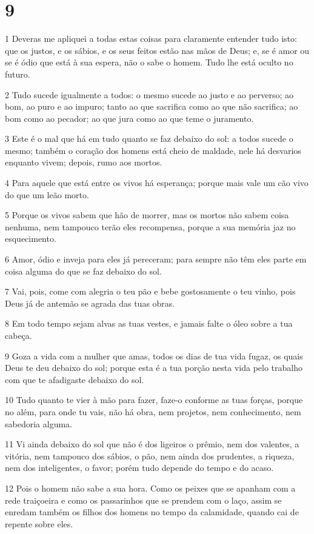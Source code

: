 \chapter{9}

\par 1 Deveras me apliquei a todas estas coisas para claramente entender tudo isto: que os justos, e os sábios, e os seus feitos estão nas mãos de Deus; e, se é amor ou se é ódio que está à sua espera, não o sabe o homem. Tudo lhe está oculto no futuro.
\par 2 Tudo sucede igualmente a todos: o mesmo sucede ao justo e ao perverso; ao bom, ao puro e ao impuro; tanto ao que sacrifica como ao que não sacrifica; ao bom como ao pecador; ao que jura como ao que teme o juramento.
\par 3 Este é o mal que há em tudo quanto se faz debaixo do sol: a todos sucede o mesmo; também o coração dos homens está cheio de maldade, nele há desvarios enquanto vivem; depois, rumo aos mortos.
\par 4 Para aquele que está entre os vivos há esperança; porque mais vale um cão vivo do que um leão morto.
\par 5 Porque os vivos sabem que hão de morrer, mas os mortos não sabem coisa nenhuma, nem tampouco terão eles recompensa, porque a sua memória jaz no esquecimento.
\par 6 Amor, ódio e inveja para eles já pereceram; para sempre não têm eles parte em coisa alguma do que se faz debaixo do sol.
\par 7 Vai, pois, come com alegria o teu pão e bebe gostosamente o teu vinho, pois Deus já de antemão se agrada das tuas obras.
\par 8 Em todo tempo sejam alvas as tuas vestes, e jamais falte o óleo sobre a tua cabeça.
\par 9 Goza a vida com a mulher que amas, todos os dias de tua vida fugaz, os quais Deus te deu debaixo do sol; porque esta é a tua porção nesta vida pelo trabalho com que te afadigaste debaixo do sol.
\par 10 Tudo quanto te vier à mão para fazer, faze-o conforme as tuas forças, porque no além, para onde tu vais, não há obra, nem projetos, nem conhecimento, nem sabedoria alguma.
\par 11 Vi ainda debaixo do sol que não é dos ligeiros o prêmio, nem dos valentes, a vitória, nem tampouco dos sábios, o pão, nem ainda dos prudentes, a riqueza, nem dos inteligentes, o favor; porém tudo depende do tempo e do acaso.
\par 12 Pois o homem não sabe a sua hora. Como os peixes que se apanham com a rede traiçoeira e como os passarinhos que se prendem com o laço, assim se enredam também os filhos dos homens no tempo da calamidade, quando cai de repente sobre eles.
